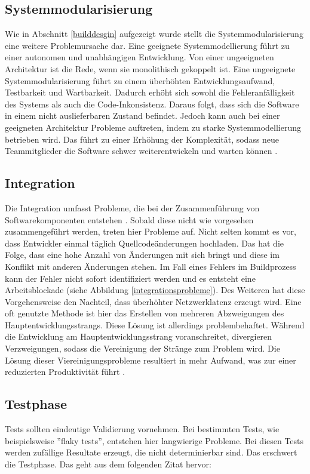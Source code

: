 \subsection{Systemmodularisierung}  \label{Systemmodularisierung}
Wie in Abschnitt \ref{builddesgin} aufgezeigt wurde stellt die Systemmodularisierung eine weitere Problemursache dar. Eine geeignete Systemmodellierung führt zu einer autonomen und unabhängigen Entwicklung. Von einer ungeeigneten Architektur ist die Rede, wenn sie monolithisch gekoppelt ist. Eine ungeeignete Systemmodularisierung führt zu einem überhöhten Entwicklungsaufwand, Testbarkeit und Wartbarkeit. Dadurch erhöht sich sowohl die Fehleranfälligkeit des Systems als auch die Code-Inkonsistenz. Daraus folgt, dass sich die Software in einem nicht auslieferbaren Zustand befindet. Jedoch kann auch bei einer geeigneten Architektur Probleme auftreten, indem zu starke Systemmodellierung betrieben wird. Das führt zu einer Erhöhung der Komplexität, sodass neue Teammitglieder die Software schwer weiterentwickeln und warten können \cite{Laukkanen.2017}. 

\subsection{Integration} \label{Integration}
Die Integration umfasst Probleme, die bei der Zusammenführung von Softwarekomponenten entstehen \cite{LianpingEtPaddy.2015}. Sobald diese nicht wie vorgesehen zusammengeführt werden, treten hier Probleme auf. Nicht selten kommt es vor, dass Entwickler einmal täglich Quellcodeänderungen hochladen. Das hat die Folge, dass eine hohe Anzahl von Änderungen mit sich bringt und diese im Konflikt mit anderen Änderungen stehen. Im Fall eines Fehlers im Buildprozess kann der Fehler nicht sofort identifiziert werden und es entsteht eine Arbeitsblockade (siehe Abbildung \ref{integrationsprobleme}). Des Weiteren hat diese Vorgehensweise den Nachteil, dass überhöhter Netzwerklatenz erzeugt wird. Eine oft genutzte Methode ist hier das Erstellen von mehreren Abzweigungen des Hauptentwicklungsstrangs. Diese Lösung ist allerdings problembehaftet. Während die Entwicklung am Hauptentwicklungsstrang voranschreitet, divergieren Verzweigungen, sodass die Vereinigung der Stränge zum Problem wird. Die Lösung dieser Viereinigungsprobleme resultiert in mehr Aufwand, was zur einer reduzierten Produktivität führt \cite{Laukkanen.2017}. 

\subsection{Testphase}
Tests sollten eindeutige Validierung vornehmen. Bei bestimmten Tests, wie beispielsweise ''flaky tests'', entstehen hier langwierige Probleme. Bei diesen Tests werden zufällige Resultate erzeugt, die nicht determinierbar sind. Das erschwert die Testphase. Das geht aus dem folgenden Zitat hervor: 

